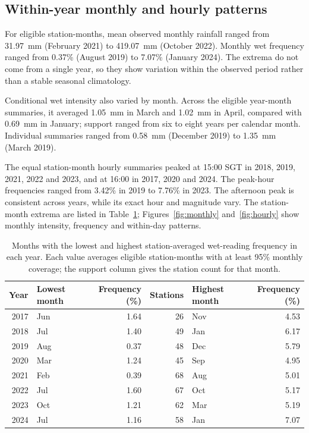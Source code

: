 \subsection{Within-year monthly and hourly patterns}
For eligible station-months, mean observed monthly rainfall ranged from
31.97~mm (February 2021) to 419.07~mm (October 2022). Monthly wet frequency
ranged from 0.37\% (August 2019) to 7.07\% (January 2024). The extrema do not
come from a single year, so they show variation within the observed period
rather than a stable seasonal climatology.

Conditional wet intensity also varied by month. Across the eligible
year-month summaries, it averaged 1.05~mm in March and 1.02~mm in April,
compared with 0.69~mm in January; support ranged from six to eight years per
calendar month. Individual summaries ranged from 0.58~mm (December 2019) to
1.35~mm (March 2019).

The equal station-month hourly summaries peaked at 15:00 SGT in 2018, 2019,
2021, 2022 and 2023, and at 16:00 in 2017, 2020 and 2024. The peak-hour
frequencies ranged from 3.42\% in 2019 to 7.76\% in 2023. The afternoon peak
is consistent across years, while its exact hour and magnitude vary. The
station-month extrema are listed in Table~\ref{tab:monthly-extrema};
Figures~\ref{fig:monthly} and~\ref{fig:hourly} show monthly intensity,
frequency and within-day patterns.

\begin{table}[htbp]
\centering\scriptsize
\caption{Months with the lowest and highest station-averaged wet-reading
frequency in each year. Each value averages eligible station-months with at
least 95\% monthly coverage; the support column gives the station count for
that month.}
\label{tab:monthly-extrema}
\begin{tabular}{r l r r l r}
\toprule
Year & Lowest month & Frequency (\%) & Stations & Highest month & Frequency (\%) \\
\midrule
2017 & Jun & 1.64 & 26 & Nov & 4.53 \\
2018 & Jul & 1.40 & 49 & Jan & 6.17 \\
2019 & Aug & 0.37 & 48 & Dec & 5.79 \\
2020 & Mar & 1.24 & 45 & Sep & 4.95 \\
2021 & Feb & 0.39 & 68 & Aug & 5.01 \\
2022 & Jul & 1.60 & 67 & Oct & 5.17 \\
2023 & Oct & 1.21 & 62 & Mar & 5.19 \\
2024 & Jul & 1.16 & 58 & Jan & 7.07 \\
\bottomrule
\end{tabular}
\end{table}

